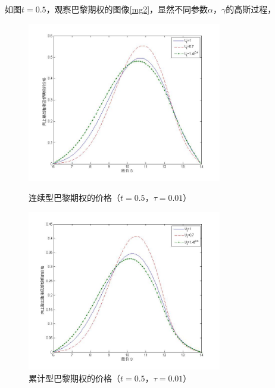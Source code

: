\documentclass{ctexart} %
\begin{document}
如图$t=0.5$，观察巴黎期权的图像\ref{mg2}，显然不同参数$\alpha$，$\gamma$的高斯过程，
\begin{figure}[H]
\begin{minipage}{0.48\linewidth}
\includegraphics[width=8.5cm]{code/t0.5.jpg}
\caption{连续型巴黎期权的价格（$t=0.5$，$\tau=0.01$）}
\end{minipage}
\begin{minipage}{0.48\linewidth}
\includegraphics[width=8.5cm]{code/tc0.5.jpg}
\caption{累计型巴黎期权的价格（$t=0.5$，$\tau=0.01$）}
\end{minipage}
\end{figure}
\end{document}
